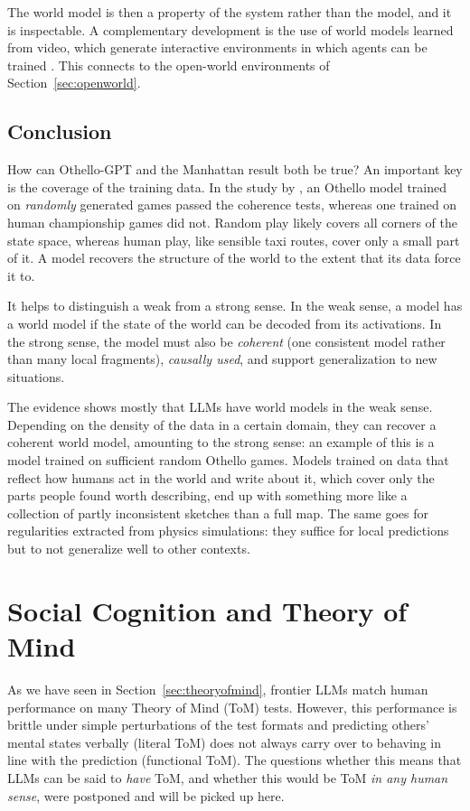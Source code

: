 The world model is then a property of the system rather than the model, and it is inspectable. A complementary development is the use of world models learned from video, which generate interactive environments in which agents can be trained \citep{bruce2024genie}. This connects to the open-world environments of Section~\ref{sec:openworld}.

\subsection{Conclusion}
How can Othello-GPT and the Manhattan result both be true? An important key is the coverage of the training data. In the study by \citet{vafa2024eval}, an Othello model trained on \emph{randomly} generated games passed the coherence tests, whereas one trained on human championship games did not. Random play likely covers all corners of the state space, whereas human play, like sensible taxi routes, cover only a small part of it. A model recovers the structure of the world to the extent that its data force it to.

It helps to distinguish a weak from a strong sense. In the weak sense, a model has a world model if the state of the world can be decoded from its activations. In the strong sense, the model must also be \emph{coherent} (one consistent model rather than many local fragments), \emph{causally used}, and support generalization to new situations.

The evidence shows mostly that LLMs have world models in the weak sense. Depending on the density of the data in a certain domain, they can recover a coherent world model, amounting to the strong sense: an example of this is a model trained on sufficient random Othello games. Models trained on data that reflect how humans act in the world and write about it, which cover only the parts people found worth describing, end up with something more like a collection of partly inconsistent sketches than a full map. The same goes for regularities extracted from physics simulations: they suffice for local predictions but to not generalize well to other contexts.

\section{Social Cognition and Theory of Mind}\label{sec:tomcognition}\label{sec:tomcog}
As we have seen in Section~\ref{sec:theoryofmind}, frontier LLMs match human performance on many Theory of Mind (ToM) tests. However, this performance is brittle under simple perturbations of the test formats and predicting others' mental states verbally (literal ToM) does not always carry over to behaving in line with the prediction (functional ToM). The questions whether this means that LLMs can be said to \emph{have} ToM, and whether this would be ToM \emph{in any human sense}, were postponed and will be picked up here.

